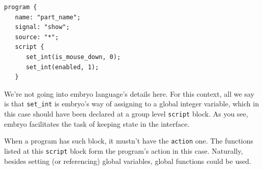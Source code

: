 \documentclass[a4paper]{profusion}
\begin{document}
\begin{lstlisting}
program {
   name: "part_name";
   signal: "show";
   source: "*";
   script {
      set_int(is_mouse_down, 0);
      set_int(enabled, 1);
   }
\end{lstlisting}

We're not going into embryo language's details here. For this context,
all we say is that \texttt{set\_int} is embryo's way of assigning to a
global integer variable, which in this case should have been declared
at a group level \texttt{script} block. As you see, embryo facilitates
the task of keeping state in the interface.

When a program has such block, it mustn't have the \texttt{action}
one. The functions listed at this \texttt{script} block form the
program's action in this case. Naturally, besides setting (or
referencing) global variables, global functions could be used.
\end{document}
